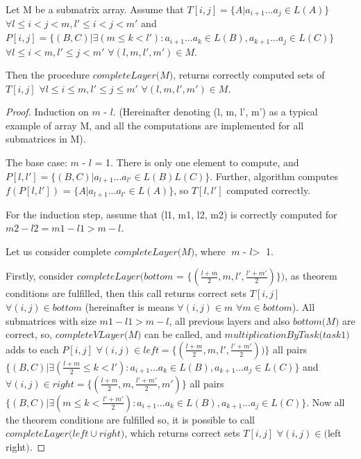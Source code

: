 \documentclass[runningheads]{llncs}
\begin{document}
\begin{theorem}
Let M be a submatrix array. Assume that $T[i, j] =  \{ A |  a_{i + 1}...a_{j} \in L(A)\}$ $\forall l \leq i < j < m,  l' \leq i < j < m'$ and $P[i, j] =  \{ (B, C) |\exists (m \le k < l'): a_{i + 1}...a_{k} \in L(B), a_{k + 1}...a_{j} \in L(C)\}$ $\forall l \leq i < m,  l' \leq j < m'$ $\forall (l, m, l', m') \in M$.

Then the procedure $\textit{completeLayer(M)}$, returns correctly computed sets of $T[i, j]$ $\forall l \leq i \le m,  l' \leq j \le m'$ $\forall (l, m, l', m') \in M$. 
\end{theorem}
%
%
\begin{proof}
Induction on $\textit{m - l}$. (Hereinafter denoting (l, m, l', m') as a typical example of array M, and all the computations are implemented for all submatrices in M).

The base case: $\textit{m - l}$ = 1. There is only one element to compute, and $P[l, l'] =  \{ (B, C) |  a_{l + 1}...a_{l'} \in L(B)L(C)\}$. Further, algorithm computes $f(P[l, l'])$ = \linebreak $\{ A |  a_{l + 1}...a_{l'} \in L(A)\}$, so $T[l, l']$ computed correctly.

For the induction step, assume that (l1, m1, l2, m2) is correctly computed for $m2 - l2 = m1 - l1 > m - l$.

Let us consider complete $\textit{completeLayer(M)}$, where $\textit{m - l} >$ 1.

Firstly, consider $\textit{completeLayer(bottom = \{$(\frac{l+m}{2}, m, l', \frac{l'+m'}{2})$\})}$, as theorem conditions are fulfilled, then this call returns correct sets $T[i, j]$ $\forall (i, j) \in bottom$ (hereinafter is means $\forall (i, j) \in m$ $\forall m \in bottom$). All submatrices with size \linebreak $m1 - l1 > m - l$, all previous layers and also $\textit{bottom(M)}$ are correct, \linebreak so,  $\textit{completeVLayer(M)}$ can be called, and $\textit{multiplicationByTask(task1)}$ adds to each $P[i, j]$ $\forall (i, j) \in left = \{(\frac{l+m}{2}, m, l', \frac{l'+m'}{2}))\}$ all pairs $\{(B, C) |\exists (\frac{l+m}{2} \le k < l'): a_{i + 1}...a_{k} \in L(B), a_{k + 1}...a_{j} \in L(C)\}$ and $\forall (i, j) \in right = \{(\frac{l+m}{2}, m, \frac{l'+m'}{2}, m')\}$ all pairs $\{ (B, C) |\exists (m \le k < \frac{l'+m'}{2}): a_{i + 1}...a_{k} \in L(B), a_{k + 1}...a_{j} \in L(C)\}$. Now all the theorem conditions are fulfilled so, it is possible to call \linebreak $\textit{completeLayer($left \cup right$)}$, which returns correct sets $T[i, j]$ $\forall (i, j) \in ($left \cup right$)$. 


\end{proof}
\end{document}
